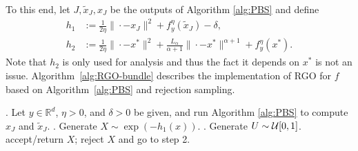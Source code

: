 \documentclass[11pt,letterpaper]{article}
\newcommand{\R}{\mathbb{R}}
\newcommand{\tx}{\tilde x}
\begin{document}


To this end, let $J, \tilde x_J, x_J$ be the outputs of Algorithm \ref{alg:PBS} and define
\begin{subequations}\label{eq:newh}
\begin{align}
    h_1 &:= \frac{1}{2\eta}\|\cdot-x_J\|^2 + f_y^\eta(\tx_J) - \delta, \label{def:tf} \\
    h_2 &:=  \frac{1}{2\eta}\|\cdot-x^*\|^2 + \frac{L_\alpha}{\alpha+1}\|\cdot-x^*\|^{\alpha+1} + f_y^\eta(x^*). \label{def:h}
\end{align}
\end{subequations}
Note that $h_2$ is only used for analysis and thus the fact it depends on $x^*$ is not an issue.
Algorithm~\ref{alg:RGO-bundle} describes the implementation of RGO for $f$ based on Algorithm~\ref{alg:PBS} and rejection sampling. 

\begin{algorithm}[H]
	\caption{RGO Implementation based on Rejection Sampling}
	\label{alg:RGO-bundle}
	\begin{algorithmic}
	    . Let $y\in \R^d$, $\eta>0$, and $\delta>0$ be given, and run Algorithm \ref{alg:PBS} to compute $x_J$ and $\tx_J$.
		. Generate  $X\sim \exp(-h_1(x))$.
		. Generate $U\sim {\cal U}[0,1]$.
            \STATE accept/return $X$;
        \ELSE
            \STATE reject $X$ and go to step 2.
        \ENDIF
	\end{algorithmic}
\end{algorithm}
\end{document}
